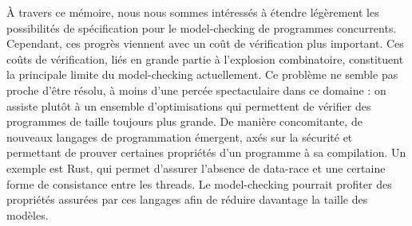 À travers ce mémoire, nous nous sommes intéressés à étendre légèrement les possibilités
de spécification pour le model-checking de programmes concurrents. Cependant,
ces progrès viennent avec un coût de vérification plus important. Ces coûts de
vérification, liés en grande partie à l'explosion combinatoire, constituent la
principale limite du model-checking actuellement. Ce problème ne semble pas
proche d'être résolu, à moins d'une percée spectaculaire dans ce domaine : on
assiste plutôt à un ensemble d'optimisations qui permettent de vérifier des
programmes de taille toujours plus grande. De manière concomitante, de nouveaux
langages de programmation émergent, axés sur la sécurité et permettant de
prouver certaines propriétés d'un programme à sa compilation. Un exemple est
Rust\cite{Rust}, qui permet d'assurer l'absence de data-race et une certaine
forme de consistance entre les threads. Le model-checking pourrait profiter des
propriétés assurées par ces langages afin de réduire davantage la taille des
modèles.